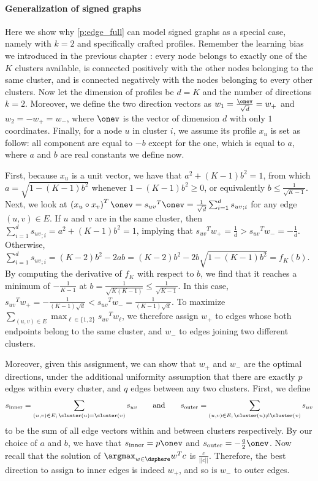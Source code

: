 \paragraph{Generalization of signed graphs}
\label{par:generalization_of_signed_graphs}

Here we show why \autoref{p:edge_full} can model signed graphs as a special case, namely with $k=2$
and specifically crafted profiles.
Remember the learning
bias we introduced in the previous chapter : every node belongs to
exactly one of the $K$ clusters available, is connected positively with the other nodes belonging to
the same cluster, and is connected negatively with the nodes belonging to every other clusters. Now
let the dimension of profiles be $d=K$ and the number of directions $k=2$. Moreover, we define the
two direction vectors as $w_1 = \frac{\onev}{\sqrt{d}} = w_+$ and $w_2 = -w_+ = w_-$, where
$\onev$ is the vector of dimension $d$ with only $1$ coordinates. Finally, for a node $u$ in
cluster $i$, we assume its profile $x_u$ is set as follow: all component are equal to $-b$ except
for the \ith{} one, which is equal to $a$, where $a$ and $b$ are real constants we define now.

First, because $x_u$ is a unit vector, we have that $a^2 + (K-1)b^2=1$, from which $a =
\sqrt{1-(K-1)b^2}$ whenever $1-(K-1)b^2 \geq 0$, or equivalently $b \leq \frac{1}{\sqrt{K-1}}$.
Next, we look at $\left(x_u \circ x_v\right)^T \onev = {s_{uv}}^T \onev = \frac{1}{\sqrt{d}}
\sum_{i=1}^d  {s_{uv}}_{;i}$ for any edge $(u,v) \in E$. If $u$ and $v$ are in the same cluster, then
$\sum_{i=1}^d  {s_{uv}}_{;i} = a^2 + (K-1)b^2 = 1$, implying that ${s_{uv}}^T w_+ = \frac{1}{d} >
{s_{uv}}^T w_- = -\frac{1}{d}$. Otherwise, $\sum_{i=1}^d  {s_{uv}}_{;i} = (K-2)b^2 - 2ab = (K-2)b^2 -
2b\sqrt{1-(K-1)b^2} = f_K(b)$. By computing the derivative of $f_K$ with respect to $b$, we find
that it reaches a minimum of $-\frac{1}{K-1}$ at $b = \frac{1}{\sqrt{K(K-1)}} \leq
\frac{1}{\sqrt{K-1}}$. In this case, ${s_{uv}}^T w_+ = -\frac{1}{(K-1) \sqrt{d}} < {s_{uv}}^T w_- =
\frac{1}{(K-1) \sqrt{d}}$. To maximize $\sum_{(u,v)\in E} \max_{\ell \in \{1, 2\}} {s_{uv}}^T
w_\ell$, we therefore assign $w_+$ to edges whose both endpoints belong to the same cluster, and
$w_-$ to edges joining two different clusters.

Moreover, given this assignment, we can show that $w_+$ and $w_-$ are the optimal directions, under
the additional uniformity assumption that there are exactly $p$ edges within every cluster, and $q$
edges between any two clusters. First, we define
\begin{equation*}
  s_{\mathrm{inner}} = \sum_{(u,v) \in E;\, \cluster(u)=\cluster(v)} s_{uv} \qquad \text{and} \qquad
  s_{\mathrm{outer}} = \sum_{(u,v) \in E;\, \cluster(u)\neq \cluster(v)} s_{uv}
\end{equation*}
to be the sum of all edge vectors within and between clusters respectively. By our choice of $a$ and
$b$, we have that $s_{\mathrm{inner}} = p\onev$ and $s_{\mathrm{outer}} = -\frac{q}{2}\onev$. Now
recall that the solution of $\argmax_{w\in \dsphere} w^T c$ is $\frac{c}{||c||}$. Therefore, the
best direction to assign to inner edges is indeed $w_+$, and so is $w_-$ to outer edges.


